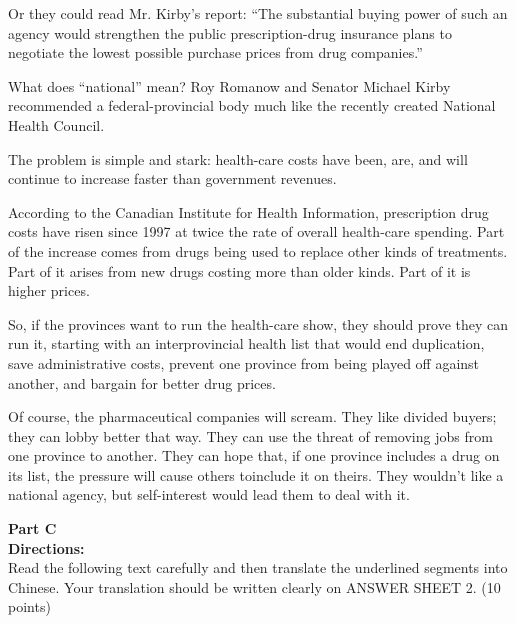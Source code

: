 {\begin{listmatch}
\item 
Or they could read Mr. Kirby's report: ``The substantial buying
power of such an agency would strengthen the public prescription-drug
insurance plans to negotiate the lowest possible purchase prices from
drug companies.''


\item 
What does ``national'' mean? Roy Romanow and Senator Michael
Kirby recommended a federal-provincial body much like the recently
created National Health Council.


\item 
The problem is simple and stark: health-care costs have been,
are, and will continue to increase faster than government revenues.


\item 
According to the Canadian Institute for Health Information,
prescription drug costs have risen since 1997 at twice the rate of
overall health-care spending. Part of the increase comes from drugs
being used to replace other kinds of treatments. Part of it arises from
new drugs costing more than older kinds. Part of it is higher prices.


\item 
 So, if the provinces want to run the health-care show, they
should prove they can run it, starting with an interprovincial health
list that would end duplication, save administrative costs, prevent one
province from being played off against another, and bargain for better
drug prices.


\item 
Of course, the pharmaceutical companies will scream. They like
divided buyers; they can lobby better that way. They can use the threat
of removing jobs from one province to another. They can hope that, if
one province includes a drug on its list, the pressure will cause others
toinclude it on theirs. They wouldn't like a national agency, but
self-interest would lead them to deal with it.
\end{listmatch}



\noindent
\textbf{Part C}\\
\textbf{Directions:}\\
Read the following text carefully and then translate the
	underlined segments into Chinese. Your translation should be written
	clearly on ANSWER SHEET 2. (10 points)


\TiGanSpace


}
